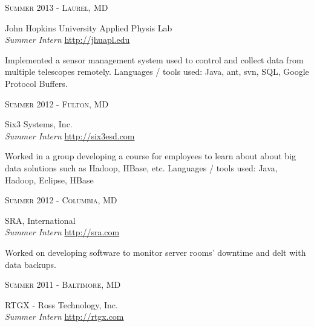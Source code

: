 \documentclass[10pt]{article} %
\begin{document}
{\begin{minipage}[t]{0.5\textwidth}
{\raggedleft\textsc{Summer 2013 - Laurel, MD}\par}

{\raggedright\large John Hopkins University Applied Physis Lab \\
\textit{Summer Intern}  \hfill {\small \href{http://jhuapl.edu}{http://jhuapl.edu}}\\ [5pt]}

\normalsize{Implemented a sensor management system used to control and collect data from multiple telescopes remotely. Languages / tools used: Java, ant, svn, SQL, Google Protocol Buffers.}\\


{\raggedleft\textsc{Summer 2012 - Fulton, MD}\par}

{\raggedright\large Six3 Systems, Inc. \\
\textit{Summer Intern} \hfill {\small \href{http://six3esd.com}{http://six3esd.com}} \\[5pt]}

\normalsize{Worked in a group developing a course for employees to learn about about big data solutions such as Hadoop, HBase, etc. Languages / tools used: Java, Hadoop, Eclipse, HBase}


{\raggedleft\textsc{Summer 2012 - Columbia, MD}\par}

{\raggedright\large SRA, International \\
\textit{Summer Intern} \hfill {\small \href{http://sra.com}{http://sra.com}} \\[5pt]}

\normalsize{Worked on developing software to monitor server rooms' downtime and delt with data backups.}\\


{\raggedleft\textsc{Summer 2011 - Baltimore, MD}\par}

{\raggedright\large RTGX - Ross Technology, Inc. \\
\textit{Summer Intern} \hfill {\small \href{http://rtgx.com}{http://rtgx.com}} \\[5pt]}


\end{minipage}}
\end{document}
